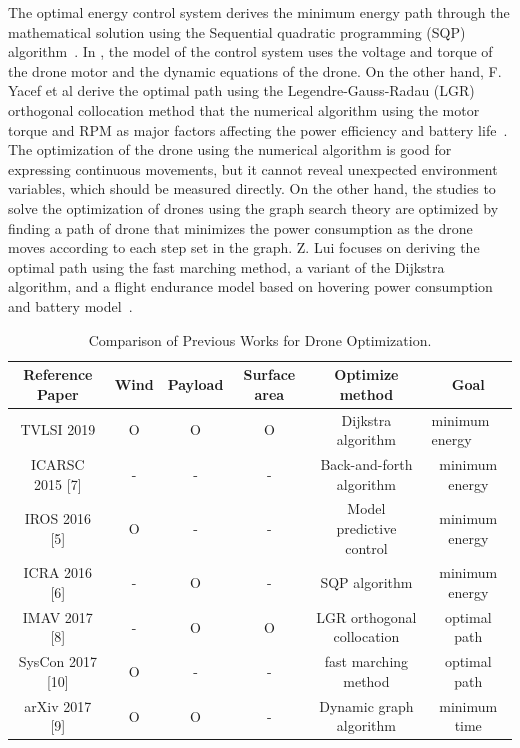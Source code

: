 \documentclass[journal]{./template/IEEEtran}
\begin{document}
The optimal energy control system derives the minimum energy path through the mathematical solution using the Sequential quadratic programming (SQP) algorithm~\cite{ref_6}. 
In \cite{ref_6}, the model of the control system uses the voltage and torque of the drone motor and the dynamic equations of the drone. 
On the other hand, F. Yacef et al derive the optimal path using the Legendre-Gauss-Radau (LGR) orthogonal collocation method that the numerical algorithm using the motor torque and RPM as major factors affecting the power efficiency and battery life~\cite{ref_7}. 
The optimization of the drone using the numerical algorithm is good for expressing continuous movements, but it cannot reveal unexpected environment variables, which should be measured directly.
On the other hand, the studies to solve the optimization of drones using the graph search theory are optimized by finding a path of drone that minimizes the power consumption as the drone moves according to each step set in the graph. 
Z. Lui focuses on deriving the optimal path using the fast marching method, a variant of the Dijkstra algorithm, and a flight endurance model based on hovering power consumption and battery model~\cite{ref_10}.

\begin{table}[ht]
\caption{Comparison of Previous Works for Drone Optimization.}
\label{Table: survay_result}
\centering
\begin{tabular}{|c|c|c|c|c|c|}
\hline
Reference Paper & Wind & Payload & Surface area & Optimize method & Goal \\ \hline
TVLSI 2019 & O & O & O & Dijkstra algorithm & \multicolumn{1}{l|}{minimum energy} \\ \hline
ICARSC 2015 {[}7{]} & - & - & - & Back-and-forth algorithm & minimum energy \\ \hline
IROS 2016 {[}5{]} & O  & - & - & Model predictive control & minimum energy \\ \hline
ICRA 2016 {[}6{]} & - & O & - & SQP algorithm & minimum energy \\ \hline
IMAV 2017 {[}8{]} & - & O & O & LGR orthogonal collocation & optimal path \\ \hline
SysCon 2017 {[}10{]} & O & - & - & fast marching method & optimal path \\ \hline
arXiv 2017 {[}9{]} & O & O & - & Dynamic graph algorithm & minimum time \\ \hline
\end{tabular}
\end{table}
\end{document}
